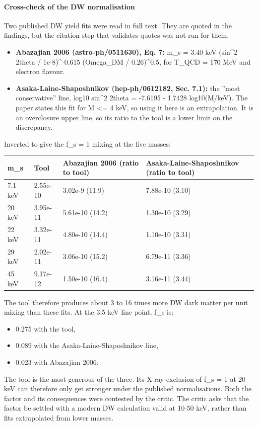 \documentclass[11pt,a4paper]{article}
\begin{document}
\paragraph{Cross-check of the DW normalisation}
Two published DW yield fits were read in full text. They are quoted in the findings, but the citation step that validates quotes was not run for them.

\begin{itemize}
  \item \textbf{Abazajian 2006 (astro-ph/0511630), Eq. 7:} m\_s = 3.40 keV (sin\textasciicircum{}2 2theta / 1e-8)\textasciicircum{}-0.615 (Omega\_DM / 0.26)\textasciicircum{}0.5, for T\_QCD = 170 MeV and electron flavour.
  \item \textbf{Asaka-Laine-Shaposhnikov (hep-ph/0612182, Sec. 7.1):} the ''most conservative'' line, log10 sin\textasciicircum{}2 2theta = -7.6195 - 1.7428 log10(M/keV). The paper states this fit for M \textless{}= 4 keV, so using it here is an extrapolation. It is an overclosure upper line, so its ratio to the tool is a lower limit on the discrepancy.
\end{itemize}
Inverted to give the f\_s = 1 mixing at the five masses:

\begin{longtable}{@{}p{}p{}p{}p{}@{}}
\toprule
\textbf{m\_s} & \textbf{Tool} & \textbf{Abazajian 2006 (ratio to tool)} & \textbf{Asaka-Laine-Shaposhnikov (ratio to tool)} \\ \midrule \endhead
7.1 keV & 2.55e-10 & 3.02e-9 (11.9) & 7.88e-10 (3.10) \\
20 keV & 3.95e-11 & 5.61e-10 (14.2) & 1.30e-10 (3.29) \\
22 keV & 3.32e-11 & 4.80e-10 (14.4) & 1.10e-10 (3.31) \\
29 keV & 2.02e-11 & 3.06e-10 (15.2) & 6.79e-11 (3.36) \\
45 keV & 9.17e-12 & 1.50e-10 (16.4) & 3.16e-11 (3.44) \\
\bottomrule\end{longtable}
The tool therefore produces about 3 to 16 times more DW dark matter per unit mixing than these fits. At the 3.5 keV line point, f\_s is:

\begin{itemize}
  \item 0.275 with the tool,
  \item 0.089 with the Asaka-Laine-Shaposhnikov line,
  \item 0.023 with Abazajian 2006.
\end{itemize}
The tool is the most generous of the three. Its X-ray exclusion of f\_s = 1 at 20 keV can therefore only get stronger under the published normalisations. Both the factor and its consequences were contested by the critic. The critic asks that the factor be settled with a modern DW calculation valid at 10-50 keV, rather than fits extrapolated from lower masses.
\end{document}

